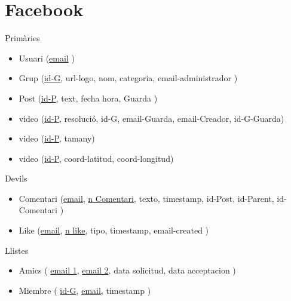 \section{Facebook}
%
Primàries
\begin{itemize}
    \item Usuari (\underline{email} )
    \item Grup (\underline{id-G}, url-logo, nom, categoria, email-administrador )
    \item Post (\underline{id-P}, text, fecha hora, Guarda )
    \item video (\underline{id-P}, resolució, id-G, email-Guarda, email-Creador, id-G-Guarda)
    \item video (\underline{id-P}, tamany)
    \item video (\underline{id-P}, coord-latitud, coord-longitud)
\end{itemize}
%
Devils
\begin{itemize}
    \item Comentari (\underline{email}, \underline{n Comentari}, texto, timestamp, id-Post, id-Parent, id-Comentari )
    \item Like (\underline{email}, \underline{n like}, tipo, timestamp, email-created )
\end{itemize}
%
Llistes
\begin{itemize}
    \item Amics ( \underline{email 1}, \underline{email 2}, data solicitud, data acceptacion )
    \item Miembre ( \underline{id-G}, \underline{email}, timestamp )
\end{itemize}